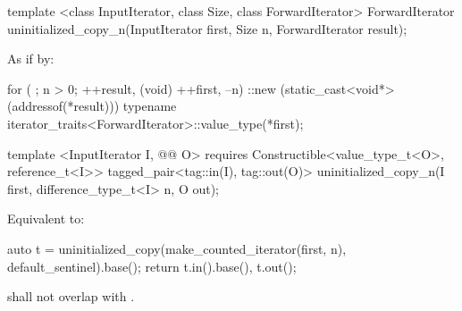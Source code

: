 {\color{remclr}
\begin{codeblock}
template <class InputIterator, class Size, class ForwardIterator>
  ForwardIterator uninitialized_copy_n(InputIterator first, Size n,
                                       ForwardIterator result);
\end{codeblock}

\setcounter{Paras}{2}
\pnum
\effects As if by:
\begin{codeblock}
        for ( ; n > 0; ++result, (void) ++first, --n) {
          ::new (static_cast<void*>(addressof(*result)))
            typename iterator_traits<ForwardIterator>::value_type(*first);
        }
\end{codeblock}

\pnum
\returns {}
} %

{\color{addclr}
\begin{codeblock}
template <InputIterator I, @@ O>
  requires
Constructible<value_type_t<O>, reference_t<I>>
  tagged_pair<tag::in(I), tag::out(O)> uninitialized_copy_n(I first, difference_type_t<I> n, O out);
\end{codeblock}

\setcounter{Paras}{4}
\pnum
\effects Equivalent to:
\begin{codeblock}
    auto t = uninitialized_copy(make_counted_iterator(first, n), default_sentinel{}).base();
    return {t.in().base(), t.out()};
\end{codeblock}

\pnum
\requires {} shall not overlap with .

} %

